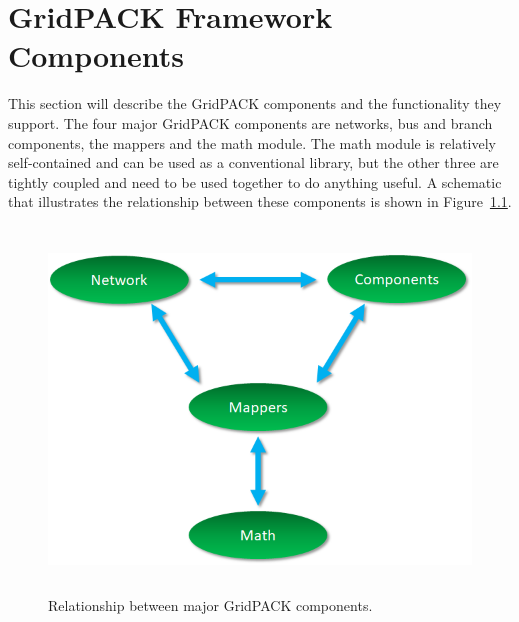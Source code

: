 \chapter{GridPACK Framework Components}

This section will describe the GridPACK components and the functionality they
support. The four major GridPACK components are networks, bus and branch
components, the mappers and the math module. The math module is relatively
self-contained and can be used as a conventional library, but the other three
are tightly coupled and need to be used together to do anything useful. A
schematic that illustrates the relationship between these components is shown in
Figure~\ref{fig:relationship}.

\begin{figure}
  \centering
    \includegraphics*[width=6in, height=3.81in, keepaspectratio=true]{figures/Relationship-Grid-components}
  \caption{Relationship between major GridPACK components.}
  \label{fig:relationship}
\end{figure}




